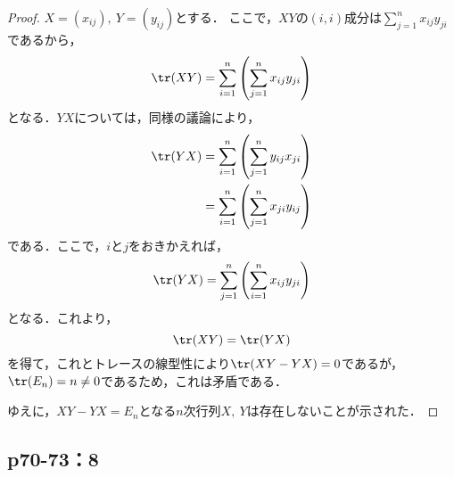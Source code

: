 \documentclass[uplatex,dvipdfmx,a4paper,10pt,fleqn]{jsarticle}
\begin{document}
\begin{tleftbar}
\begin{proof}
$X=(x_{ij}),~Y=(y_{ij})$とする．
ここで，$XY$の$(i,i)$成分は$\sum_{j=1}^{n} x_{ij} y_{ji}$であるから，
\begin{equation*}
\tr (XY)  =  \sum_{i=1}^{n} \left( \sum_{j=1}^{n} x_{ij} y_{ji} \right)
\end{equation*}
となる．$YX$については，同様の議論により，
\begin{align*}
\tr  (YX) & =  \sum_{i=1}^{n}\left( \sum_{j=1}^{n}  y_{ij} x_{ji} \right) \\
 & =  \sum_{i=1}^{n} \left( \sum_{j=1}^{n}  x_{ji} y_{ij} \right)
\end{align*}
である．ここで，$i$と$j$をおきかえれば，
\begin{equation}
\tr  (YX) = \sum_{j=1}^{n} \left( \sum_{i=1}^{n}  x_{ij} y_{ji} \right)
\end{equation}
となる．これより，
\begin{equation}
\tr (XY) = \tr  (YX)
\end{equation}
を得て，これとトレースの線型性により$\tr (XY-YX) =0$であるが，$\tr  (E_n) =n \neq 0$であるため，これは矛盾である．

ゆえに，$XY-YX=E_n$となる$n$次行列$X,~Y$は存在しないことが示された．
\end{proof}
\end{tleftbar}

\newpage 

\subsection*{p70-73：8}
\end{document}
